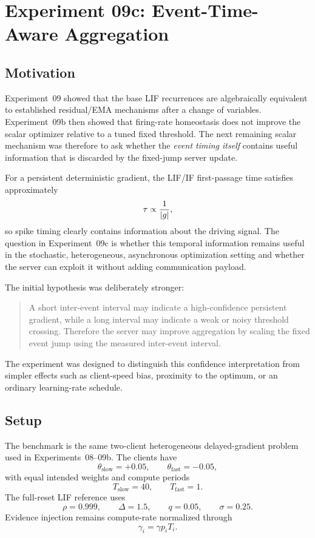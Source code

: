 \section{Experiment 09c: Event-Time-Aware Aggregation}

\subsection{Motivation}
Experiment~09 showed that the base LIF recurrences are algebraically equivalent to established residual/EMA mechanisms after a change of variables. Experiment~09b then showed that firing-rate homeostasis does not improve the scalar optimizer relative to a tuned fixed threshold. The next remaining scalar mechanism was therefore to ask whether the \emph{event timing itself} contains useful information that is discarded by the fixed-jump server update.

For a persistent deterministic gradient, the LIF/IF first-passage time satisfies approximately
\begin{equation}
  \tau \propto \frac{1}{\left|g\right|},
\end{equation}
so spike timing clearly contains information about the driving signal. The question in Experiment~09c is whether this temporal information remains useful in the stochastic, heterogeneous, asynchronous optimization setting and whether the server can exploit it without adding communication payload.

The initial hypothesis was deliberately stronger:
\begin{quote}
A short inter-event interval may indicate a high-confidence persistent gradient, while a long interval may indicate a weak or noisy threshold crossing. Therefore the server may improve aggregation by scaling the fixed event jump using the measured inter-event interval.
\end{quote}
The experiment was designed to distinguish this confidence interpretation from simpler effects such as client-speed bias, proximity to the optimum, or an ordinary learning-rate schedule.

\subsection{Setup}
The benchmark is the same two-client heterogeneous delayed-gradient problem used in Experiments~08--09b. The clients have
\begin{equation}
  \theta_{\mathrm{slow}}=+0.05,
  \qquad
  \theta_{\mathrm{fast}}=-0.05,
\end{equation}
with equal intended weights and compute periods
\begin{equation}
  T_{\mathrm{slow}}=40,
  \qquad
  T_{\mathrm{fast}}=1.
\end{equation}
The full-reset LIF reference uses
\begin{equation}
  \rho=0.999,
  \qquad
  \Delta=1.5,
  \qquad
  q=0.05,
  \qquad
  \sigma=0.25.
\end{equation}
Evidence injection remains compute-rate normalized through
\begin{equation}
  \gamma_i=\gamma p_i T_i.
\end{equation}

